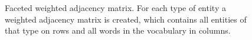 \begin{figure}
\centering 
\resizebox{0.97\textwidth}{0.26\textwidth}{      

}
 \caption{Faceted weighted adjacency matrix. For each type of entity a weighted adjacency matrix is created, which contains all entities of that type on rows and all words in the vocabulary in columns.}
 \label{fig:co-matrix}
\end{figure}
